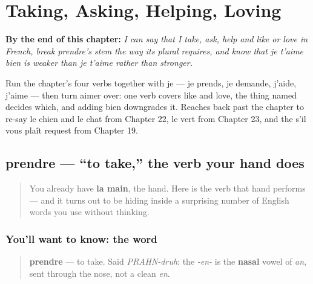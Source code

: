 
\chapter{Taking, Asking, Helping, Loving}
\label{ch:fr-taking-asking-helping-loving}

\begin{chapteropening}
\textbf{By the end of this chapter:} \emph{I can say that I take, ask, help and like or love in French, break prendre's stem the way its plural requires, and know that je t'aime bien is weaker than je t'aime rather than stronger.}

Run the chapter's four verbs together with je — je prends, je demande, j'aide, j'aime — then turn aimer over: one verb covers like and love, the thing named decides which, and adding bien downgrades it. Reaches back past the chapter to re-say le chien and le chat from Chapter 22, le vert from Chapter 23, and the s'il vous plaît request from Chapter 19.
\end{chapteropening}

\section[prendre]{prendre — \textquotedblleft{}to take,\textquotedblright{} the verb your hand does}

\label{lesson:FR-C24-prendre}



\begin{quote}
You already have \textbf{la main}, the hand. Here is the verb that hand performs — and it turns out to be hiding inside a surprising number of English words you use without thinking.
\end{quote}

\subsection*{You'll want to know: the word}
\begin{quote}
\textbf{prendre} — to take. Said \emph{PRAHN-druh}: the \emph{-en-} is the \textbf{nasal} vowel of \emph{an}, sent through the nose, not a clean \emph{en}.
\end{quote}

